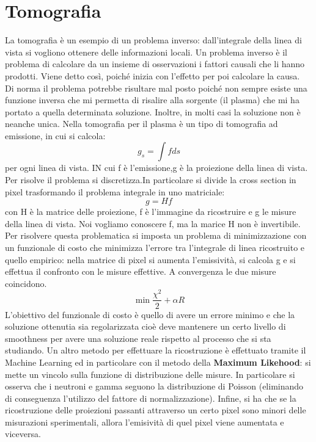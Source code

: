 \documentclass{article}
\begin{document}
\section{Tomografia}
La tomografia è un esempio di un problema inverso: dall'integrale della linea di vista si vogliono ottenere delle informazioni locali. Un problema inverso è il problema di calcolare da un insieme di osservazioni i fattori causali che li hanno prodotti. Viene detto così, poiché inizia con l'effetto per poi calcolare la causa.\\
Di norma il problema potrebbe risultare mal posto poiché non sempre esiste una funzione inversa che mi permetta di risalire alla sorgente (il plasma) che mi ha portato a quella determinata soluzione. Inoltre, in molti casi la soluzione non è neanche unica.\newline
Nella tomografia per il plasma è un tipo di tomografia ad emissione, in cui si calcola:\begin{equation*}
	g_{s}=\int f ds
\end{equation*}
per ogni linea di vista. IN cui f è l'emissione,g è la proiezione della linea di vista.\newline
Per risolve il problema si discretizza.In particolare si divide la cross section in pixel trasformando il problema integrale in uno matriciale:\begin{equation*}
	g=Hf
\end{equation*}
con H è la matrice delle proiezione, f è l'immagine da ricostruire e g le misure della linea di vista. Noi vogliamo conoscere f, ma la marice H non è invertibile. Per risolvere questa problematica si imposta un problema di minimizzazione con un funzionale di costo che minimizza l'errore tra l'integrale di linea ricostruito e quello empirico: nella matrice di pixel si aumenta l'emissività, si calcola g e si effettua il confronto con le misure effettive. A convergenza le due misure coincidono.
\begin{equation*}
	\min{\frac{\chi^{2}}{2}+\alpha R}
\end{equation*}
L'obiettivo del funzionale di costo è quello di avere un errore minimo e che la soluzione ottenutia sia regolarizzata cioè deve mantenere un certo livello di smoothness per avere una soluzione reale rispetto al processo che si sta studiando. Un altro metodo per effettuare la ricostruzione è effettuato tramite il Machine Learning ed in particolare con il metodo della \textbf{Maximum Likehood}: si mette un vincolo sulla funzione di distribuzione delle misure. In particolare si osserva che i neutroni e gamma seguono la distribuzione di Poisson (eliminando di conseguenza l'utilizzo del fattore di normalizzazione). Infine, si ha che se la ricostruzione delle proiezioni passanti attraverso un certo pixel sono minori delle misurazioni sperimentali, allora l'emisività di quel pixel viene aumentata e viceversa.\newline
\end{document}
